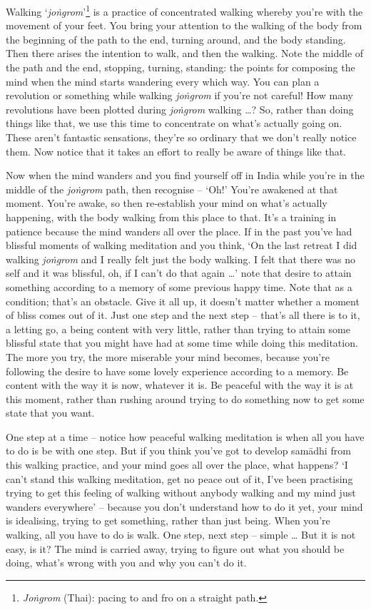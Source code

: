 
Walking `\textit{joṅgrom}'\footnote{\textit{Joṅgrom} (Thai): pacing to and fro on a straight path.} is a practice of concentrated walking whereby you're with the movement of your feet. You bring your attention to the walking of the body from the beginning of the path to the end, turning around, and the body standing. Then there arises the intention to walk, and then the walking. Note the middle of the path and the end, stopping, turning, standing: the points for composing the mind when the mind starts wandering every which way. You can plan a revolution or something while walking \textit{joṅgrom} if you're not careful! How many revolutions have been plotted during \textit{joṅgrom} walking \ldots{}? So, rather than doing things like that, we use this time to concentrate on what's actually going on. These aren't fantastic sensations, they're so ordinary that we don't really notice them. Now notice that it takes an effort to really be aware of things like that.

Now when the mind wanders and you find yourself off in India while you're in the middle of the \textit{joṅgrom} path, then recognise -- `Oh!' You're awakened at that moment. You're awake, so then re-establish your mind on what's actually happening, with the body walking from this place to that. It's a training in patience because the mind wanders all over the place. If in the past you've had blissful moments of walking meditation and you think, `On the last retreat I did walking \textit{joṅgrom} and I really felt just the body walking. I felt that there was no self and it was blissful, oh, if I can't do that again \ldots{}' note that desire to attain something according to a memory of some previous happy time. Note that as a condition; that's an obstacle. Give it all up, it doesn't matter whether a moment of bliss comes out of it. Just one step and the next step -- that's all there is to it, a letting go, a being content with very little, rather than trying to attain some blissful state that you might have had at some time while doing this meditation. The more you try, the more miserable your mind becomes, because you're following the desire to have some lovely experience according to a memory. Be content with the way it is now, whatever it is. Be peaceful with the way it is at this moment, rather than rushing around trying to do something now to get some state that you want.

One step at a time -- notice how peaceful walking meditation is when all you have to do is be with one step. But if you think you've got to develop samādhi from this walking practice, and your mind goes all over the place, what happens? `I can't stand this walking meditation, get no peace out of it, I've been practising trying to get this feeling of walking without anybody walking and my mind just wanders everywhere' -- because you don't understand how to do it yet, your mind is idealising, trying to get something, rather than just being. When you're walking, all you have to do is walk. One step, next step -- simple \ldots{} But it is not easy, is it? The mind is carried away, trying to figure out what you should be doing, what's wrong with you and why you can't do it.

